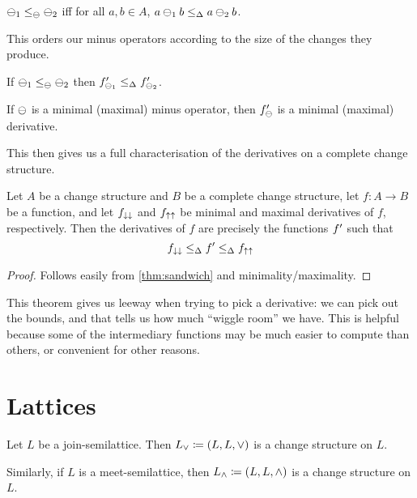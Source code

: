 \begin{defn}
  $\ominus_1 \leq_\ominus \ominus_2$ iff for all $a,b \in A$, $a \ominus_1 b
  \leq_\Delta a \ominus_2 b$.
\end{defn}

This orders our minus operators according to the size of the changes they
produce. 

\begin{prop}
  If $\ominus_1 \leq_\ominus \ominus_2$ then
  $f'_{\ominus_1} \leq_\Delta f'_{\ominus_2}$.
\end{prop}

\begin{prop}
  If $\ominus$ is a minimal (maximal) minus operator, then $f'_\ominus$
  is a minimal (maximal) derivative.
\end{prop}

This then gives us a full characterisation of the derivatives on a complete
change structure.

\begin{thm}
\label{thm:derivativeCharacterization}
  Let $A$ be a change structure and $B$ be a complete change structure, let
  $f: A \rightarrow B$ be a function, and let $f_{\downarrow\downarrow}$ and
  $f_{\uparrow\uparrow}$ be minimal and maximal derivatives of $f$, respectively.
  Then the derivatives of $f$ are precisely
  the functions $f'$ such that
  $$f_{\downarrow\downarrow} \leq_\Delta f' \leq_\Delta f_{\uparrow\uparrow}$$
\end{thm}
\begin{proof}
  Follows easily from \ref{thm:sandwich} and minimality/maximality.
\end{proof}

This theorem gives us leeway when trying to pick a derivative: we can pick out the
bounds, and that tells us how much ``wiggle room'' we have. This is helpful
because some of the intermediary functions may be much easier to compute than
others, or convenient for other reasons.

\section{Lattices}

\begin{defn}
  Let $L$ be a join-semilattice. Then $L_\vee \coloneqq (L,L,\vee)$ is a change
  structure on $L$.

  Similarly, if $L$ is a meet-semilattice, then $L_\wedge \coloneqq (L,L,\wedge)$ is a change
  structure on $L$.
\end{defn}

